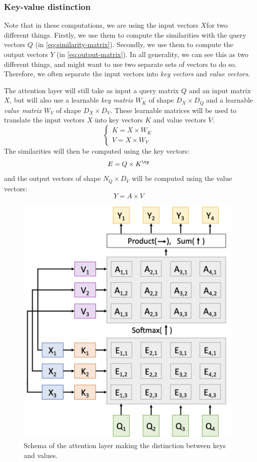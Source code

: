 \subsubsection{Key-value distinction}
Note that in these computations, we are using the input vectors $X$for two different things. Firstly, we use them to compute the similarities with the query vectors $Q$ (in \autoref{eq:similarity-matrix}). Secondly, we use them to compute the output vectors $Y$ (in \autoref{eq:output-matrix}). In all generality, we can see this as two different things, and might want to use two separate sets of vectors to do so. Therefore, we often separate the input vectors into \emph{key vectors} and \emph{value vectors}.

The attention layer will still take as input a query matrix $Q$ and an input matrix $X$, but will also use a learnable \emph{key matrix} $W_K$ of shape $D_X\times D_Q$ and a learnable \emph{value matrix} $W_V$ of shape $D_X\times D_V$. These learnable matrices will be used to translate the input vectors $X$ into key vectors $K$ and value vectors $V$:
\begin{equation*}
    \begin{cases}
        K = X\times W_K\\
        V = X\times W_V
    \end{cases}
\end{equation*}
The similarities will then be computed using the key vectors:
\begin{equation*}
    E = Q\times K^\tp
\end{equation*}
and the output vectors of shape $N_Q\times D_V$ will be computed using the value vectors:
\begin{equation*}
    Y = A\times V
\end{equation*}

\begin{figure}[H]
    \centering
    \includegraphics[width=.4\textwidth]{images/attention-layer.png}
    \caption{Schema of the attention layer making the distinction between keys and values.}
\end{figure}

